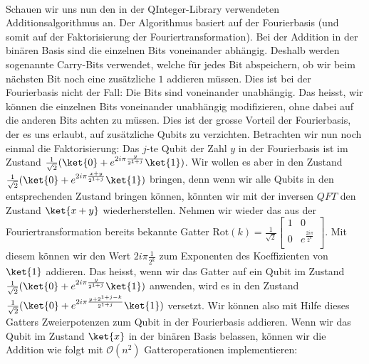 \paragraph{}

Schauen wir uns nun den in der QInteger-Library verwendeten Additionsalgorithmus an. Der Algorithmus basiert auf der Fourierbasis (und somit auf der Faktorisierung der Fouriertransformation). Bei der Addition in der binären Basis sind die einzelnen Bits voneinander abhängig. Deshalb werden sogenannte Carry-Bits verwendet, welche für jedes Bit abspeichern, ob wir beim nächsten Bit noch eine zusätzliche $1$ addieren müssen. Dies ist bei der Fourierbasis nicht der Fall: Die Bits sind voneinander unabhängig. Das heisst, wir können die einzelnen Bits voneinander unabhängig modifizieren, ohne dabei auf die anderen Bits achten zu müssen. Dies ist der grosse Vorteil der Fourierbasis, der es uns erlaubt, auf zusätzliche Qubits zu verzichten. Betrachten wir nun noch einmal die Faktorisierung: Das $j$-te Qubit der Zahl $y$ in der Fourierbasis ist im Zustand $\frac{1}{\sqrt{2}}(\ket{0} + e^{2i\pi\frac{y}{2^{1 + j}}}\ket{1})$. Wir wollen es aber in den Zustand $\frac{1}{\sqrt{2}}(\ket{0} + e^{2i\pi\frac{x + y}{2^{1 + j}}}\ket{1})$ bringen, denn wenn wir alle Qubits in den entsprechenden Zustand bringen können, könnten wir mit der inversen $QFT$ den Zustand $\ket{x + y}$ wiederherstellen. Nehmen wir wieder das aus der Fouriertransformation bereits bekannte Gatter $\text{Rot}(k) = \frac{1}{\sqrt{2}}\begin{bmatrix}
    1 & 0 \\
    0 & e^{\frac{2i\pi}{2^k}} \\
\end{bmatrix}$. Mit diesem können wir den Wert $2i\pi\frac{1}{2^k}$ zum Exponenten des Koeffizienten von $\ket{1}$ addieren. Das heisst, wenn wir das Gatter auf ein Qubit im Zustand $\frac{1}{\sqrt{2}}(\ket{0} + e^{2i\pi\frac{y}{2^{1 + j}}}\ket{1})$ anwenden, wird es in den Zustand $\frac{1}{\sqrt{2}}(\ket{0} + e^{2i\pi\frac{y + 2^{1 + j - k}}{2^{1 + j}}}\ket{1})$ versetzt. Wir können also mit Hilfe dieses Gatters Zweierpotenzen zum Qubit in der Fourierbasis addieren. Wenn wir das Qubit im Zustand $\ket{x}$ in der binären Basis belassen, können wir die Addition wie folgt mit $\mathcal O(n^2)$ Gatteroperationen implementieren:
